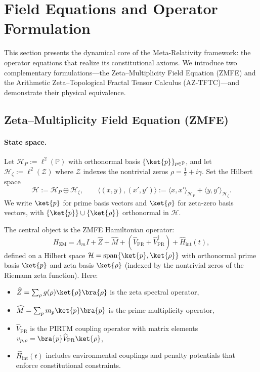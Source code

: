 \documentclass[12]{amsart}
\theoremstyle{plain}
\begin{document}
\section{Field Equations and Operator Formulation}

This section presents the dynamical core of the Meta-Relativity framework: the operator equations that realize its constitutional axioms. We introduce two complementary formulations---the Zeta--Multiplicity Field Equation (ZMFE) and the Arithmetic Zeta--Topological Fractal Tensor Calculus (AZ-TFTC)---and demonstrate their physical equivalence.

\subsection{Zeta--Multiplicity Field Equation (ZMFE)}

\paragraph{State space.}
Let $\mathcal H_{\!P}:=\ell^2(\mathbb P)$ with orthonormal basis $\{\ket{p}\}_{p\in\mathbb P}$, and let
$\mathcal H_{\!\zeta}:=\ell^2(\mathcal Z)$ where $\mathcal Z$ indexes the nontrivial zeros $\rho=\tfrac12+i\gamma$.
Set the Hilbert space
\[
\mathcal H:=\mathcal H_{\!P}\oplus \mathcal H_{\!\zeta},\qquad
\langle (x,y),(x',y')\rangle := \langle x,x'\rangle_{\mathcal H_{\!P}}+\langle y,y'\rangle_{\mathcal H_{\!\zeta}}.
\]
We write $\ket{p}$ for prime basis vectors and $\ket{\rho}$ for zeta-zero basis vectors, with
$\{\ket{p}\}\cup\{\ket{\rho}\}$ orthonormal in $\mathcal H$.

The central object is the ZMFE Hamiltonian operator:
\begin{equation}\label{eq:ZM_Hamiltonian}
    H_{\mathrm{ZM}} = \Lambda_m I + \widehat{Z} + \widehat{M} + \left( \widehat{V}_{\mathrm{PR}} + \widehat{V}_{\mathrm{PR}}^\dagger \right) + \widehat{H}_{\mathrm{int}}(t),
\end{equation}
defined on a Hilbert space $\mathcal{H} = \operatorname{span}\{ \ket{p}, \ket{\rho} \}$ with orthonormal prime basis $\ket{p}$ and zeta basis $\ket{\rho}$ (indexed by the nontrivial zeros of the Riemann zeta function). Here:
\begin{itemize}
    \item $\widehat{Z} = \sum_\rho g(\rho) \ket{\rho}\bra{\rho}$ is the zeta spectral operator,
    \item $\widehat{M} = \sum_p m_p \ket{p}\bra{p}$ is the prime multiplicity operator,
    \item $\widehat{V}_{\mathrm{PR}}$ is the PIRTM coupling operator with matrix elements $v_{p,\rho} = \bra{p} \widehat{V}_{\mathrm{PR}} \ket{\rho}$,
    \item $\widehat{H}_{\mathrm{int}}(t)$ includes environmental couplings and penalty potentials that enforce constitutional constraints.
\end{itemize}
\end{document}
